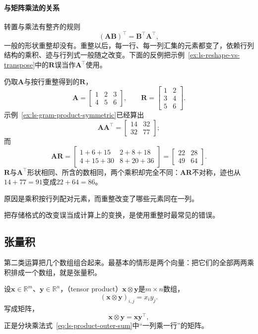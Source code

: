 \paragraph{与矩阵乘法的关系}
转置与乘法有整齐的规则
\[
 (\bm A\bm B)^\top=\bm B^\top\bm A^\top,
\]
一般的形状重整却没有。重整以后，每一行、每一列汇集的元素都变了，依赖行列结构的乘积、迹与行列式一般随之改变。下面的反例把示例~\ref{ex:ls-reshape-vs-transpose}中的$\bm R$误当作$\bm A^\top$使用。
\begin{example}[反例：重整不能代替转置]
\label{ex:ls-reshape-breaks-product}
仍取$\bm A$与按行重整得到的$\bm R$，
\[
 \bm A=\begin{bmatrix}1&2&3\\4&5&6\end{bmatrix},\qquad
 \bm R=\begin{bmatrix}1&2\\3&4\\5&6\end{bmatrix}.
\]
示例~\ref{ex:ls-gram-product-symmetric}已经算出
\[
 \bm A\bm A^\top=\begin{bmatrix}14&32\\32&77\end{bmatrix};
\]
而
\[
 \bm A\bm R=\begin{bmatrix}1+6+15&2+8+18\\4+15+30&8+20+36\end{bmatrix}=\begin{bmatrix}22&28\\49&64\end{bmatrix}.
\]
$\bm R$与$\bm A^\top$形状相同、所含的数相同，两个乘积却完全不同：$\bm A\bm R$不对称，迹也从$14+77=91$变成$22+64=86$。

原因是乘积按行列配对元素，而重整改变了哪些元素同在一列。
\end{example}
把存储格式的改变误当成计算上的变换，是使用重整时最常见的错误。

\subsection{张量积}
\label{sec:ls-tensor-products}
\label{sec:linear-algebra-joint-operations}

第二类运算把几个数组组合起来。最基本的情形是两个向量：把它们的全部两两乘积排成一个数组，就是张量积。

设$\bm x\in\mathbb R^m$、$\bm y\in\mathbb R^n$，（tensor product）$\bm x\otimes\bm y$是$m\times n$数组，
\begin{equation}
 (\bm x\otimes\bm y)_{i,j}=x_i y_j.
 \label{eq:ls-tensor-product}
\end{equation}
写成矩阵，
\[
 \bm x\otimes\bm y=\bm x\bm y^\top,
\]
正是分块乘法式~\eqref{eq:ls-product-outer-sum}中“一列乘一行”的矩阵。


